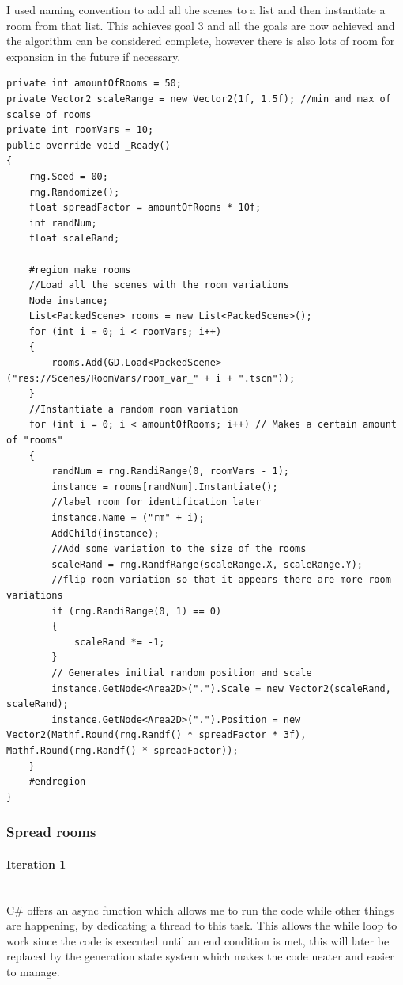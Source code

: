 \documentclass{article}
\newcommand{\parBr}{\vspace{5mm}}%
\newcommand{\myparagraph}[1]{\paragraph{#1}\mbox{}\\} %
\begin{document}
I used naming convention to add all the scenes to a list and then instantiate a room from that list. This achieves goal 3 and all the goals are now achieved and the algorithm can be considered complete, however there is also lots of room for expansion in the future if necessary.
\begin{lstlisting}
private int amountOfRooms = 50;
private Vector2 scaleRange = new Vector2(1f, 1.5f); //min and max of scalse of rooms
private int roomVars = 10;
public override void _Ready()
{
    rng.Seed = 00;
    rng.Randomize(); 
    float spreadFactor = amountOfRooms * 10f;
    int randNum;
    float scaleRand;
    
    #region make rooms
    //Load all the scenes with the room variations
    Node instance;
    List<PackedScene> rooms = new List<PackedScene>();
    for (int i = 0; i < roomVars; i++)
    {
        rooms.Add(GD.Load<PackedScene>("res://Scenes/RoomVars/room_var_" + i + ".tscn"));
    }
	//Instantiate a random room variation
    for (int i = 0; i < amountOfRooms; i++) // Makes a certain amount of "rooms"
    {
        randNum = rng.RandiRange(0, roomVars - 1);
        instance = rooms[randNum].Instantiate();
        //label room for identification later
        instance.Name = ("rm" + i);
        AddChild(instance);
		//Add some variation to the size of the rooms
        scaleRand = rng.RandfRange(scaleRange.X, scaleRange.Y);
		//flip room variation so that it appears there are more room variations
        if (rng.RandiRange(0, 1) == 0)
        {
            scaleRand *= -1;
        }
		// Generates initial random position and scale
        instance.GetNode<Area2D>(".").Scale = new Vector2(scaleRand, scaleRand);
        instance.GetNode<Area2D>(".").Position = new Vector2(Mathf.Round(rng.Randf() * spreadFactor * 3f), Mathf.Round(rng.Randf() * spreadFactor)); 
    }
    #endregion
}
\end{lstlisting}

\subsubsection{Spread rooms}
\myparagraph{Iteration 1}
C\# offers an async function which allows me to run the code while other things are happening, by dedicating a thread to this task. This allows the while loop to work since the code is executed until an end condition is met, this will later be replaced by the generation state system which makes the code neater and easier to manage.

\parBr
\end{document}

